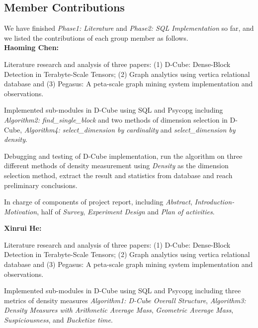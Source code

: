 
\subsection{Member Contributions}

We have finished \textit{Phase1: Literature} and \textit{Phase2: SQL Implementation} so far, and we listed the contributions of each group member as follows. \\

\textbf{Haoming Chen:}
\bit
\setlength\itemsep{1em}
\item Literature research and analysis of three papers: (1) D-Cube: Dense-Block Detection in Terabyte-Scale Tensors\cite{shin2017d}; (2) Graph analytics using vertica relational database\cite{jindal2015graph} and (3) Pegasus: A peta-scale graph mining system implementation and observations\cite{kang2009pegasus}.

\item Implemented sub-modules in D-Cube using SQL and Psycopg including \textit{Algorithm2: find\_single\_block} and two methods of dimension selection in D-Cube, \textit{Algorithm4: select\_dimension by cardinality} and 
\textit{select\_dimension by density}.

\item Debugging and testing of D-Cube implementation, run the algorithm on three different methods of density measurement using \textit{Density} as the dimension selection method, extract the result and statistics from database and reach preliminary conclusions. 

\item In charge of components of project report, including \textit{Abstract}, \textit{Introduction-Motivation}, half of \textit{Survey}, \textit{Experiment Design} and \textit{Plan of activities}.
\eit 

\textbf{Xinrui He:}
\bit
\setlength\itemsep{1em}
\item Literature research and analysis of three papers: (1) D-Cube: Dense-Block Detection in Terabyte-Scale Tensors\cite{shin2017d}; (2) Graph analytics using vertica relational database\cite{jindal2015graph} and (3) Pegasus: A peta-scale graph mining system implementation and observations\cite{kang2009pegasus}.

\item Implemented sub-modules in D-Cube using SQL and Psycopg including three metrics of density measures \textit{Algorithm1: D-Cube Overall Structure}, \textit{Algorithm3: Density Measures with Arithmetic Average Mass}, \textit{Geometric Average Mass}, \textit{Suspiciousness}, and \textit{Bucketize time}.

